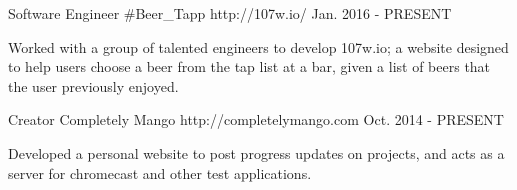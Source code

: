 


\begin{cventries}


\cventry
{Software Engineer} %
{\#Beer\_Tapp} %
{http://107w.io/} %
{Jan. 2016 - PRESENT} %
{ %
\begin{cvitems}
\item {Worked with a group of talented engineers to develop 107w.io; a website designed to help users choose a beer from the tap list at a bar, given a list of beers that the user previously enjoyed.}
\end{cvitems}
}


\cventry
{Creator} %
{Completely Mango} %
{http://completelymango.com} %
{Oct. 2014 - PRESENT} %
{ %
\begin{cvitems}
\item {Developed a personal website to post progress updates on projects, and acts as a server for chromecast and other test applications.} 
\end{cvitems}
}


\end{cventries}
